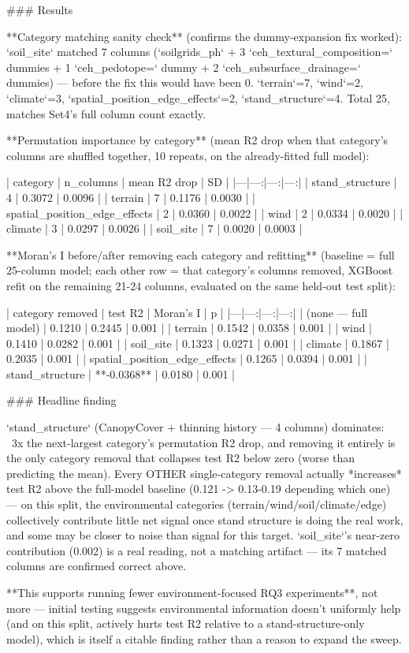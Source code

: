 ### Results

**Category matching sanity check** (confirms the dummy-expansion fix worked): `soil_site` matched
7 columns (`soilgrids_ph` + 3 `ceh_textural_composition=` dummies + 1 `ceh_pedotope=` dummy + 2
`ceh_subsurface_drainage=` dummies) — before the fix this would have been 0. `terrain`=7,
`wind`=2, `climate`=3, `spatial_position_edge_effects`=2, `stand_structure`=4. Total 25, matches
Set4's full column count exactly.

**Permutation importance by category** (mean R2 drop when that category's columns are shuffled
together, 10 repeats, on the already-fitted full model):

| category | n_columns | mean R2 drop | SD |
|---|---:|---:|---:|
| stand_structure | 4 | 0.3072 | 0.0096 |
| terrain | 7 | 0.1176 | 0.0030 |
| spatial_position_edge_effects | 2 | 0.0360 | 0.0022 |
| wind | 2 | 0.0334 | 0.0020 |
| climate | 3 | 0.0297 | 0.0026 |
| soil_site | 7 | 0.0020 | 0.0003 |

**Moran's I before/after removing each category and refitting** (baseline = full 25-column
model; each other row = that category's columns removed, XGBoost refit on the remaining 21-24
columns, evaluated on the same held-out test split):

| category removed | test R2 | Moran's I | p |
|---|---:|---:|---:|
| (none — full model) | 0.1210 | 0.2445 | 0.001 |
| terrain | 0.1542 | 0.0358 | 0.001 |
| wind | 0.1410 | 0.0282 | 0.001 |
| soil_site | 0.1323 | 0.0271 | 0.001 |
| climate | 0.1867 | 0.2035 | 0.001 |
| spatial_position_edge_effects | 0.1265 | 0.0394 | 0.001 |
| stand_structure | **-0.0368** | 0.0180 | 0.001 |

### Headline finding

`stand_structure` (CanopyCover + thinning history — 4 columns) dominates: ~3x the next-largest
category's permutation R2 drop, and removing it entirely is the only category removal that
collapses test R2 below zero (worse than predicting the mean). Every OTHER single-category
removal actually *increases* test R2 above the full-model baseline (0.121 -> 0.13-0.19 depending
which one) — on this split, the environmental categories (terrain/wind/soil/climate/edge)
collectively contribute little net signal once stand structure is doing the real work, and some
may be closer to noise than signal for this target. `soil_site`'s near-zero contribution (0.002)
is a real reading, not a matching artifact — its 7 matched columns are confirmed correct above.

**This supports running fewer environment-focused RQ3 experiments**, not more — initial testing
suggests environmental information doesn't uniformly help (and on this split, actively hurts test
R2 relative to a stand-structure-only model), which is itself a citable finding rather than a
reason to expand the sweep.

